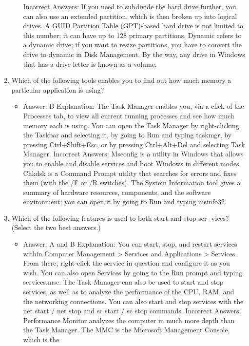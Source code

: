 \documentclass{article}
\begin{document}
\begin{enumerate}
\begin{itemize}
Incorrect Answers: If you need to subdivide the hard drive further, you can also use an
extended partition, which is then broken up into logical drives. A GUID Partition Table
(GPT)-based hard drive is not limited to this number; it can have up to 128 primary
partitions. Dynamic refers to a dynamic drive; if you want to resize partitions, you have
to convert the drive to dynamic in Disk Management. By the way, any drive in Windows
that has a drive letter is known as a volume.
     \end{itemize}
     \item Which of the following tools enables you to find out how much
memory a particular application is using?
     \begin{itemize}
         \item Answer: B
Explanation: The Task Manager enables you, via a click of the Processes tab, to view
all current running processes and see how much memory each is using. You can open
the Task Manager by right-clicking the Taskbar and selecting it, by going to Run and
typing taskmgr, by pressing Ctrl+Shift+Esc, or by pressing Ctrl+Alt+Del and selecting
Task Manager.
Incorrect Answers: Msconfig is a utility in Windows that allows you to enable and
disable services and boot Windows in different modes. Chkdsk is a Command Prompt
utility that searches for errors and fixes them (with the /F or /R switches). The
System Information tool gives a summary of hardware resources, components, and the
software environment; you can open it by going to Run and typing msinfo32.
     \end{itemize}
     \item Which of the following features is used to both start and stop ser-
vices? (Select the two best answers.)
     \begin{itemize}
         \item  Answer: A and B
Explanation: You can start, stop, and restart services within Computer Management >
Services and Applications > Services. From there, right-click the service in question
and configure it as you wish. You can also open Services by going to the Run prompt
and typing services.msc. The Task Manager can also be used to start and stop
services, as well as to analyze the performance of the CPU, RAM, and the networking
connections. You can also start and stop services with the net start / net stop
and sc start / sc stop commands.
Incorrect Answers: Performance Monitor analyzes the computer in much more depth
than the Task Manager. The MMC is the Microsoft Management Console, which is the

\end{itemize}
\end{enumerate}
\end{document}
